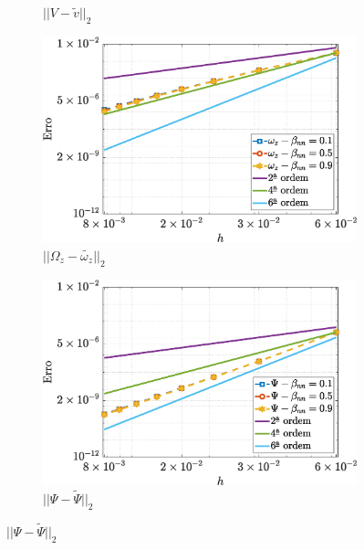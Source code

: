 \begin{figure}[H]
\begin{subfigure}[b]{.47\textwidth}
        \caption{$||V - \widetilde{v}||_{2}$}
        \label{error_v_2nd_Case1_LPTT_eps_05}
    \end{subfigure}
    \qquad
    \begin{subfigure}[b]{.47\textwidth}
        \includegraphics[width=\textwidth]{figures/Case12/LPTT/Errors/NormErr_2nd_Re_100_Wi_1_epsilon_0.5_xi_0.1_alphaG_0_Dt_1e-06_at_0.05_tipsim_1_MMS_12_Wz.eps}
        \caption{$||\Omega_{z} - \widetilde{\omega_{z}}||_{2}$}
        \label{error_wz_2nd_Case1_LPTT_eps_05}
    \end{subfigure}
    \qquad
    \begin{subfigure}[b]{.47\textwidth}
        \includegraphics[width=\textwidth]{figures/Case12/LPTT/Errors/NormErr_2nd_Re_100_Wi_1_epsilon_0.5_xi_0.1_alphaG_0_Dt_1e-06_at_0.05_tipsim_1_MMS_12_Psi.eps}
        \caption{$||\Psi - \widetilde{\Psi}||_{2}$}
        \label{error_psi_2nd_Case1_LPTT_eps_05}
    \end{subfigure}
    \fdadospesquisa
\end{figure}

